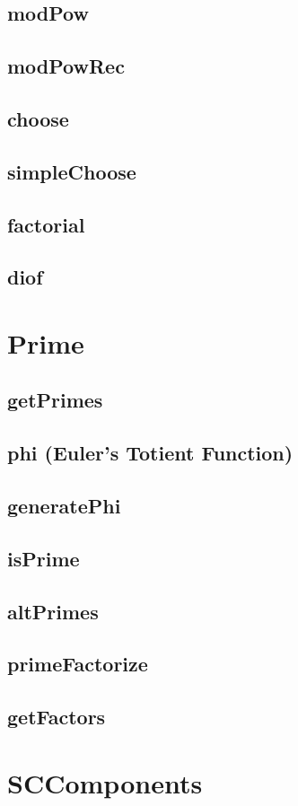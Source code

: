 \documentclass[a4paper]{article}
\begin{document}
\subsection{modPow}
\subsection{modPowRec}
\subsection{choose}
\subsection{simpleChoose}
\subsection{factorial}
\subsection{diof}
\section{Prime}
\subsection{getPrimes}
\subsection{phi (Euler's Totient Function)}
\subsection{generatePhi}
\subsection{isPrime}
\subsection{altPrimes}
\subsection{primeFactorize}
\subsection{getFactors}
\section{SCComponents}
\end{document}
